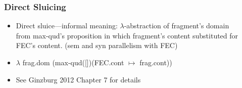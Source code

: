 \documentclass{beamer}
\newcommand{\bit}{\begin{itemize}}
\newcommand{\eit}{\end{itemize}}
\begin{document}
\begin{frame}\frametitle{ Direct Sluicing}

\bit

\item Direct sluice---informal meaning: $\lambda$-abstraction of  fragment's domain\\
                 from max-qud's proposition in which  fragment's
                 content substituted for FEC's content. (sem and syn   parallelism   with FEC)

\pause
\item  $\lambda$ frag.dom (max-qud([])(FEC.cont $\mapsto$ frag.cont)) 

\item See Ginzburg 2012 Chapter 7 for details
\eit
\end{frame}
\end{document}
